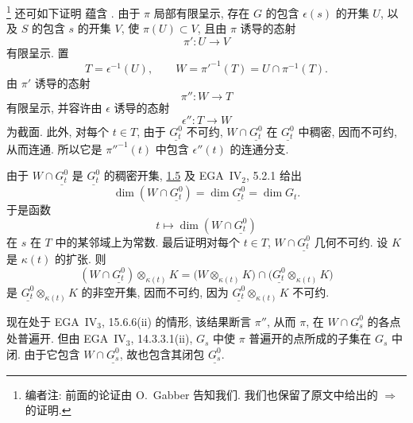 \footnote{\label{note:sga3-VIB-30}编者注: 前面的论证由 O.\ Gabber 告知我们.
我们也保留了原文中给出的 \textup{}
\(\Rightarrow\)\textup{} 的证明.}%
还可如下证明  蕴含
.
由于 \(\pi\) 局部有限呈示, 存在 \(G\) 的包含 \(\epsilon(s)\) 的开集 \(U\),
以及 \(S\) 的包含 \(s\) 的开集 \(V\),
使 \(\pi(U)\subset V\), 且由 \(\pi\) 诱导的态射
\[
  \pi':U\longrightarrow V
\]
有限呈示. 置
\[
  T=\epsilon^{-1}(U),
  \qquad
  W={\pi'}^{-1}(T)=U\cap\pi^{-1}(T).
\]
由 \(\pi'\) 诱导的态射
\[
  \pi'':W\longrightarrow T
\]
有限呈示, 并容许由 \(\epsilon\) 诱导的态射
\[
  \epsilon'':T\longrightarrow W
\]
为截面. 此外, 对每个 \(t\in T\), 由于 \(\underline{G_t^0}\) 不可约,
\(W\cap\underline{G_t^0}\) 在 \(\underline{G_t^0}\) 中稠密,
因而不可约, 从而连通. 所以它是 \({\pi''}^{-1}(t)\)
中包含 \(\epsilon''(t)\) 的连通分支.

由于 \(W\cap\underline{G_t^0}\) 是 \(\underline{G_t^0}\) 的稠密开集,
\hyperref[lem:sga3-VIB-1.5]{1.5} 及 EGA~IV\(_2\), 5.2.1 给出
\[
  \dim(W\cap\underline{G_t^0})=\dim\underline{G_t^0}=\dim G_t.
\]
于是函数
\[
  t\longmapsto\dim(W\cap\underline{G_t^0})
\]
在 \(s\) 在 \(T\) 中的某邻域上为常数.
最后证明对每个 \(t\in T\), \(W\cap\underline{G_t^0}\) 几何不可约.
设 \(K\) 是 \(\kappa(t)\) 的扩张. 则
\[
  (W\cap\underline{G_t^0})\otimes_{\kappa(t)}K
    =
  \bigl(W\otimes_{\kappa(t)}K\bigr)
    \cap
  \bigl(\underline{G_t^0}\otimes_{\kappa(t)}K\bigr)
\]
是 \(\underline{G_t^0}\otimes_{\kappa(t)}K\) 的非空开集,
因而不可约, 因为 \(\underline{G_t^0}\otimes_{\kappa(t)}K\) 不可约.

现在处于 EGA~IV\(_3\), 15.6.6(ii) 的情形,
该结果断言 \(\pi''\), 从而 \(\pi\),
在 \(W\cap\underline{G_s^0}\) 的各点处普遍开.
但由 EGA~IV\(_3\), 14.3.3.1(ii),
\(G_s\) 中使 \(\pi\) 普遍开的点所成的子集在 \(G_s\) 中闭.
由于它包含 \(W\cap\underline{G_s^0}\), 故也包含其闭包 \(\underline{G_s^0}\).


